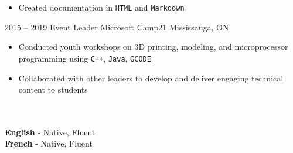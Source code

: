 \documentclass[9pt]{src/developercv} %
\begin{document}
\begin{entrylist}
{\begin{itemize}
					\item Created documentation in \texttt{HTML} and \texttt{Markdown}
				\end{itemize}
			}
		\atsentry
			{2015 -- 2019}
			{Event Leader}
			{Microsoft Camp21}
			{Mississauga, ON}
			{
				\vspace{-1.0\baselineskip}
				\begin{itemize}
					\item Conducted youth workshops on 3D printing, modeling, and microprocessor programming using \texttt{C++}, \texttt{Java}, \texttt{GCODE}
					\item Collaborated with other leaders to develop and deliver engaging technical content to students
				\end{itemize}
			}
	\end{entrylist}

	\begin{minipage}[t]{\textwidth}
		\colorbox{sky600}{\textcolor{white}{\LARGE\MakeUppercase{\textbf{Languages}}}}\\\\%
		\textbf{English} - Native, Fluent\\
		\textbf{French} - Native, Fluent
	\end{minipage}

	\pagebreak
\end{document}
